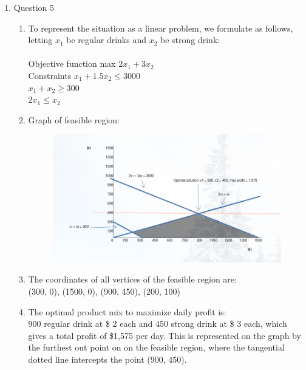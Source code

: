 \documentclass{article}
\newcommand\tab[1][1cm]{\hspace*{#1}}
\begin{document}
\begin{enumerate}
  \item Question 5
      \begin{enumerate}
        \item To represent the situation as a linear problem, we formulate as follows, letting 
          $x_{1}$ be regular drinks and $x_{2}$ be strong drink:\\\\
          \tab Objective function \tab max $2x_{1}+3x_{2}$  \\
          \tab Constraints \tab \tab $x_{1}+1.5x_{2} \leq 3000$  \\
          \tab \tab \tab \tab \tab $x_{1} + x_{2} \geq 300$\\
          \tab \tab \tab \tab \tab $2x_{1} \leq x_{2}$\\

        \item Graph of feasible region:
          \begin{figure}[h]
            \centering
        \includegraphics[scale=.55]{feasiblegraph4.png}
        \end{figure}
    
        \item The coordinates of all vertices of the feasible region are:\\
          (300, 0), (1500, 0), (900, 450), (200, 100)

        \item The optimal product mix to maximize daily profit is:\\
          900 regular drink at \$ 2 each and 450 strong drink at \$ 3 each, which 
          gives a total profit of \$1,575 per day.
          This is represented on the graph by the furthest out point on on the 
          feasible region, where the tangential dotted line intercepts the point
          (900, 450).

      \end{enumerate}

\end{enumerate}
\end{document}
